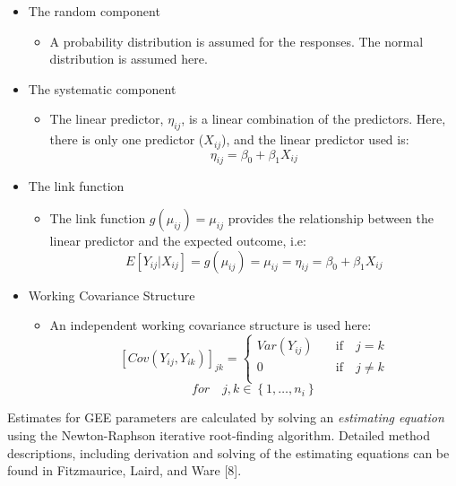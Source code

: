 \documentclass[12pt,]{article}
\providecommand{\tightlist}{%
  \setlength{\itemsep}{0pt}\setlength{\parskip}{0pt}}
\begin{document}
\begin{itemize}
\tightlist
\item
  The random component

  \begin{itemize}
  \tightlist
  \item
    A probability distribution is assumed for the responses. The normal
    distribution is assumed here.
  \end{itemize}
\item
  The systematic component

  \begin{itemize}
  \tightlist
  \item
    The linear predictor, \(\eta_{ij}\), is a linear combination of the
    predictors. Here, there is only one predictor (\(X_{ij}\)), and the
    linear predictor used is:
    \[\eta_{ij} = \beta_{0} + \beta_{1} X_{ij}\]
  \end{itemize}
\item
  The link function

  \begin{itemize}
  \tightlist
  \item
    The link function \(g(\mu_{ij})=\mu_{ij}\) provides the relationship
    between the linear predictor and the expected outcome, i.e:
    \[E\left [Y_{ij} | X_{ij} \right ] = g(\mu_{ij}) = \mu_{ij}= \eta_{ij} = \beta_{0}+ \beta_{1} X_{ij}\]
  \end{itemize}
\item
  Working Covariance Structure

  \begin{itemize}
  \tightlist
  \item
    An independent working covariance structure is used here:
    \[\left [ Cov\left(Y_{ij}, Y_{ik}\right)\right ]_{jk}=
    \begin{cases}
    Var\left(Y_{ij}\right)  \quad &\mbox{if} \quad j=k \\
    0 \quad &\mbox{if} \quad j \neq k \\
    \end{cases}\]
    \[for \quad j,k \in \left \{  1, \ldots, n_{i}   \right \}\]
  \end{itemize}
\end{itemize}

Estimates for GEE parameters are calculated by solving an
\textit{estimating equation} using the Newton-Raphson iterative
root-finding algorithm. Detailed method descriptions, including
derivation and solving of the estimating equations can be found in
Fitzmaurice, Laird, and Ware {[}8{]}.
\end{document}
